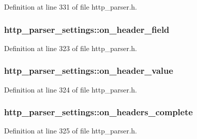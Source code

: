 Definition at line 331 of file http\-\_\-parser.\-h.

\hypertarget{structhttp__parser__settings_acfb3fd7947c5ff3e16649c71aa13bff2}{
\subsubsection[{on\-\_\-header\-\_\-field}]{ http\-\_\-parser\-\_\-settings\-::on\-\_\-header\-\_\-field}}\label{structhttp__parser__settings_acfb3fd7947c5ff3e16649c71aa13bff2}


Definition at line 323 of file http\-\_\-parser.\-h.

\hypertarget{structhttp__parser__settings_a2af4e9085fa79ee52b31e626179bc561}{
\subsubsection[{on\-\_\-header\-\_\-value}]{ http\-\_\-parser\-\_\-settings\-::on\-\_\-header\-\_\-value}}\label{structhttp__parser__settings_a2af4e9085fa79ee52b31e626179bc561}


Definition at line 324 of file http\-\_\-parser.\-h.

\hypertarget{structhttp__parser__settings_a743b24c8f33e0f1cf60a96c824c42071}{
\subsubsection[{on\-\_\-headers\-\_\-complete}]{ http\-\_\-parser\-\_\-settings\-::on\-\_\-headers\-\_\-complete}}\label{structhttp__parser__settings_a743b24c8f33e0f1cf60a96c824c42071}


Definition at line 325 of file http\-\_\-parser.\-h.

